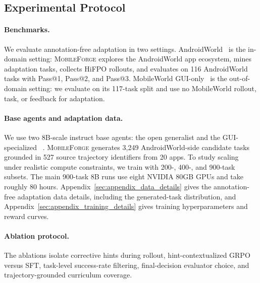\documentclass{llmxive}
\providecommand{\ourmethod}{\textsc{MobileForge}\xspace}
\providecommand{\hifpo}{HiFPO\xspace}
\begin{document}
\subsection{Experimental Protocol}

\paragraph{Benchmarks.}
We evaluate annotation-free adaptation in two settings. AndroidWorld~\citep{rawles2024androidworld} is the in-domain setting: \ourmethod explores the AndroidWorld app ecosystem, mines adaptation tasks, collects \hifpo rollouts, and evaluates on 116 AndroidWorld tasks with Pass@1, Pass@2, and Pass@3. MobileWorld GUI-only~\citep{kong2026mobileworld} is the out-of-domain setting: we evaluate on its 117-task split and use no MobileWorld rollout, task, or feedback for adaptation.

\paragraph{Base agents and adaptation data.}
We use two 8B-scale instruct base agents: the open generalist  and the GUI-specialized ~\citep{bai2025qwen3,xu2026mobile}. \ourmethod generates 3,249 AndroidWorld-side candidate tasks grounded in 527 source trajectory identifiers from 20 apps. To study scaling under realistic compute constraints, we train with 200-, 400-, and 900-task subsets. The main 900-task 8B runs use eight NVIDIA 80GB GPUs and take roughly 80 hours. Appendix~\ref{sec:appendix_data_details} gives the annotation-free adaptation data details, including the generated-task distribution, and Appendix~\ref{sec:appendix_training_details} gives training hyperparameters and reward curves.

\paragraph{Ablation protocol.}
The ablations isolate corrective hints during rollout, hint-contextualized GRPO versus SFT, task-level success-rate filtering, final-decision evaluator choice, and trajectory-grounded curriculum coverage.

\setcounter{insight}{0}
\end{document}
